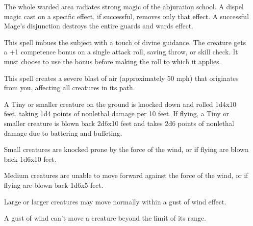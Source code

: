 \begin{multicols}{2}
\begin{small}
\smallskip\noindent The whole warded area radiates strong magic of the abjuration school. A dispel magic cast on a specific effect, if successful, removes only that effect. A successful Mage's disjunction destroys the entire guards and wards effect.


\noindent This spell imbues the subject with a touch of divine guidance. The creature gets a +1 competence bonus on a single attack roll, saving throw, or skill check. It must choose to use the bonus before making the roll to which it applies.

\noindent This spell creates a severe blast of air (approximately 50 mph) that originates from you, affecting all creatures in its path.

\smallskip\noindent A Tiny or smaller creature on the ground is knocked down and rolled 1d4x10 feet, taking 1d4 points of nonlethal damage per 10 feet. If flying, a Tiny or smaller creature is blown back 2d6x10 feet and takes 2d6 points of nonlethal damage due to battering and buffeting.

\smallskip\noindent Small creatures are knocked prone by the force of the wind, or if flying are blown back 1d6x10 feet.

\smallskip\noindent Medium creatures are unable to move forward against the force of the wind, or if flying are blown back 1d6x5 feet.

\smallskip\noindent Large or larger creatures may move normally within a gust of wind effect.

\smallskip\noindent A gust of wind can't move a creature beyond the limit of its range.


\end{small}
\end{multicols}
